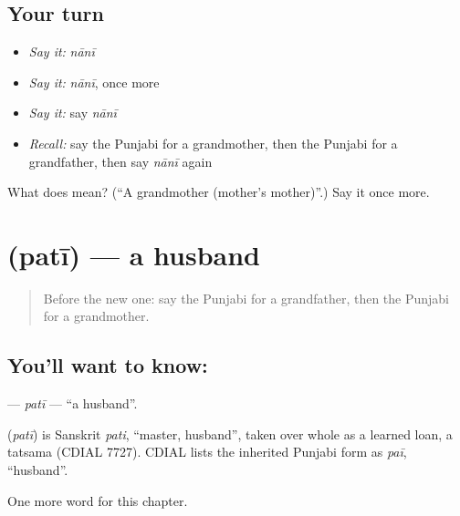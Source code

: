 \subsection*{Your turn}
\begin{itemize}
\raggedright
  \item \emph{Say it:} \emph{nānī}
  \item \emph{Say it:} \emph{nānī}, once more
  \item \emph{Say it:} say \emph{nānī}
  \item \emph{Recall:} say the Punjabi for a grandmother, then the Punjabi for a grandfather, then say \emph{nānī} again
\end{itemize}

\begin{tcolorbox}[breakable,colback=teal!4,colframe=teal!35!black,title={Before you move on}]
What does  mean? (\textquotedblleft{}A grandmother (mother's mother)\textquotedblright{}.) Say it once more.
\end{tcolorbox}
\section[\texorpdfstring{\pa{ਪਤੀ} (patī)}{ਪਤੀ (patī)}]{ (patī) — a husband}

\label{lesson:PA-C54-pati}



\begin{quote}
Before the new one: say the Punjabi for a grandfather, then the Punjabi for a grandmother.
\end{quote}

\subsection*{You'll want to know: }
\textbf{} — \emph{patī} — \textquotedblleft{}a husband\textquotedblright{}.

\begin{cousinweb}
\textbf{} (\emph{patī}) is Sanskrit \emph{pati}, \textquotedblleft{}master, husband\textquotedblright{}, taken over whole as a learned loan, a tatsama (CDIAL 7727). CDIAL lists the inherited Punjabi form as \emph{paī}, \textquotedblleft{}husband\textquotedblright{}.
\end{cousinweb}

\begin{grammarlens}[title={What you've built}]
One more word for this chapter.
\end{grammarlens}

